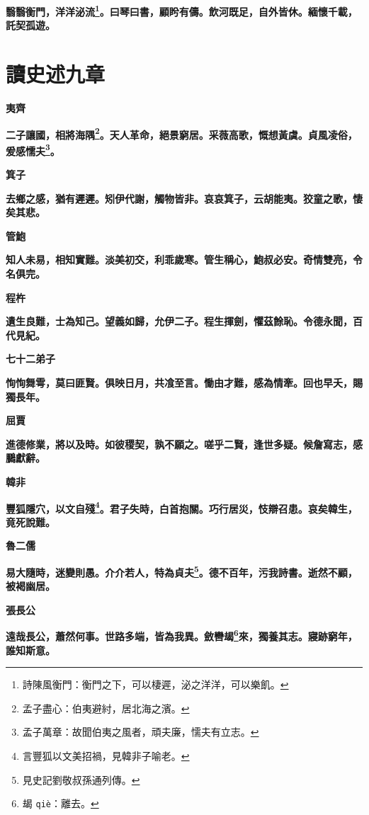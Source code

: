 \textbf{翳翳衡門，洋洋泌流\footnote{詩陳風衡門：衡門之下，可以棲遲，泌之洋洋，可以樂飢。}。曰琴曰書，顧盻有儔。飲河既足，自外皆休。緬懷千載，託契孤遊。}

\section{讀史述九章\hspace{1ex}{\footnotesize 余讀史記有所感而述之}}

\begin{quoting}\textbf{夷齊}\end{quoting}

\textbf{二子讓國，相將海隅\footnote{孟子盡心：伯夷避紂，居北海之濱。}。天人革命，絕景窮居。采薇高歌，慨想黃虞。貞風凌俗，爰感懦夫\footnote{孟子萬章：故聞伯夷之風者，頑夫廉，懦夫有立志。}。}

\begin{quoting}\textbf{箕子}\end{quoting}

\textbf{去鄉之感，猶有遲遲。矧伊代謝，觸物皆非。哀哀箕子，云胡能夷。狡童之歌，悽矣其悲。}

\begin{quoting}\textbf{管鮑}\end{quoting}

\textbf{知人未易，相知實難。淡美初交，利乖歲寒。管生稱心，鮑叔必安。奇情雙亮，令名俱完。}

\begin{quoting}\textbf{程杵}\end{quoting}

\textbf{遺生良難，士為知己。望義如歸，允伊二子。程生揮劍，懼茲餘恥。令德永聞，百代見紀。}

\begin{quoting}\textbf{七十二弟子}\end{quoting}

\textbf{恂恂舞雩，莫曰匪賢。俱映日月，共飡至言。慟由才難，感為情牽。回也早夭，賜獨長年。}

\begin{quoting}\textbf{屈賈}\end{quoting}

\textbf{進德修業，將以及時。如彼稷契，孰不願之。嗟乎二賢，逢世多疑。候詹寫志，感鵩獻辭。}

\begin{quoting}\textbf{韓非}\end{quoting}

\textbf{豐狐隱穴，以文自殘\footnote{言豐狐以文美招禍，見韓非子喻老。}。君子失時，白首抱關。巧行居災，忮辯召患。哀矣韓生，竟死說難。}

\begin{quoting}\textbf{魯二儒}\end{quoting}

\textbf{易大隨時，迷變則愚。介介若人，特為貞夫\footnote{見史記劉敬叔孫通列傳。}。德不百年，污我詩書。逝然不顧，被褐幽居。}

\begin{quoting}\textbf{張長公}\end{quoting}

\textbf{遠哉長公，蕭然何事。世路多端，皆為我異。斂轡朅\footnote{朅 \texttt{qiè}：離去。}來，獨養其志。寢跡窮年，誰知斯意。}

